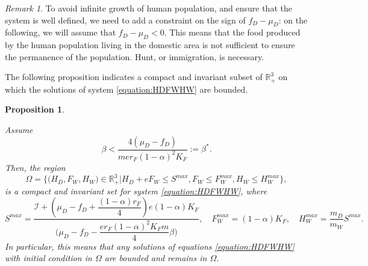 \documentclass{article}
\newcommand{\cI}{\mathcal{I}}
\newtheorem{prop}[theorem]{Proposition}
\theoremstyle{definition}
\theoremstyle{remark}
\newtheorem{remark}[theorem]{Remark}
\begin{document}
\begin{remark}
To avoid infinite growth of human population, and ensure that the system is well defined, we need to add a constraint on the sign of $f_D - \mu_D$: on the following, we will assume that $f_D - \mu_D < 0$. This means that the food produced by the human population living in the domestic area is not sufficient to ensure the permanence of the population. Hunt, or immigration, is necessary. 
\end{remark}

The following proposition indicates a compact and invariant subset of $\mathbb{R}_+^3$ on which the solutions of system \eqref{equation:HDFWHW} are bounded.

\begin{prop}\label{prop:invariantRegion} 

Assume 
\begin{equation*}
\beta < \dfrac{4(\mu_D - f_D)}{m e r_F (1-\alpha)^2 K_F} := \beta^*.
\end{equation*}
Then, the region
$$\Omega = \Big\{\Big(H_D, F_W, H_W \Big) \in \mathbb{R}_+^3  \Big|H_D + eF_W \leq S^{max}, F_W \leq F_W^{max}, H_W \leq H_W^{max} \Big\},$$
is a compact and invariant set for system \eqref{equation:HDFWHW}, 
where
$$
S^{max} = \dfrac{\cI + \left( \mu_D - f_D   +  \dfrac{(1-\alpha)r_F}{4}\right)e(1-\alpha)K_F}{  \Big(\mu_D -f_D - \dfrac{er_F (1-\alpha)^2K_F m}{4} \beta\Big)} ,
\quad
F_W^{max} = (1-\alpha)K_F,
\quad
H_W^{max} = \dfrac{m_D}{m_W} S^{max}.
$$
In particular, this means that any solutions of equations \eqref{equation:HDFWHW} with initial condition in $\Omega$ are bounded and remains in $\Omega$.
\end{prop}
%
\end{document}
